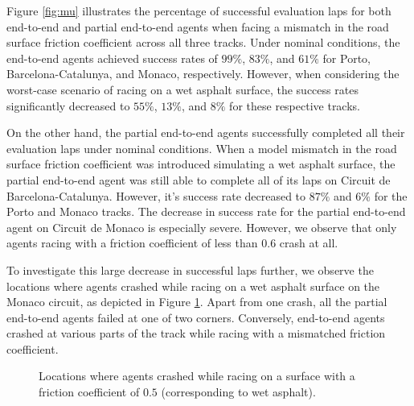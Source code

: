 Figure \ref{fig:mu} illustrates the percentage of successful evaluation laps for both end-to-end and partial end-to-end agents when facing a mismatch in the road surface friction coefficient across all three tracks. 
Under nominal conditions, the end-to-end agents achieved success rates of $99\%$, $83\%$, and $61\%$ for Porto, Barcelona-Catalunya, and Monaco, respectively. However, when considering the worst-case scenario of racing on a wet asphalt surface, the success rates significantly decreased to $55\%$, $13\%$, and $8\%$ for these respective tracks.

On the other hand, the partial end-to-end agents successfully completed all their evaluation laps under nominal conditions. 
When a model mismatch in the road surface friction coefficient was introduced simulating a wet asphalt surface, the partial end-to-end agent was still able to complete all of its laps on Circuit de Barcelona-Catalunya.
However, it's success rate decreased to  $87\%$ and $6\%$ for the Porto and Monaco tracks.
The decrease in success rate for the partial end-to-end agent on Circuit de Monaco is especially severe.
However, we observe that only agents racing with a friction coefficient of less than $0.6$ crash at all. 

To investigate this large decrease in successful laps further, we observe  the locations where agents crashed while racing on a wet asphalt surface on the Monaco circuit, as depicted in Figure \ref{fig:mu_crash_locations}.
Apart from one crash, all the partial end-to-end agents failed at one of two corners.
Conversely, end-to-end agents crashed at various parts of the track while racing with a mismatched friction coefficient.


\begin{figure}[htb!]
    \centering
    
    \caption[Locations where agents crashed while racing on a wet asphalt surface]{Locations where agents crashed while racing on a surface with a friction coefficient of $0.5$ (corresponding to wet asphalt).}
    \label{fig:mu_crash_locations}
\end{figure}

